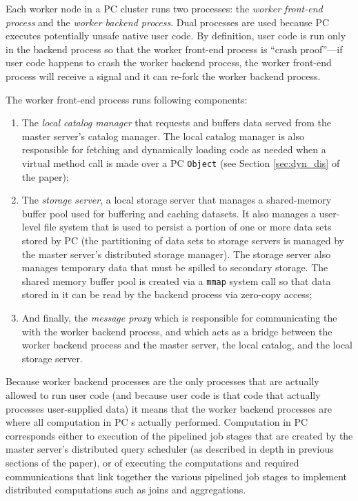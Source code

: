 \noindent 
Each worker node in a PC cluster runs two processes: the \emph{worker front-end process} and the \emph{worker backend process}.
Dual processes are used because PC executes potentially unsafe native user code.  By definition, user code is run only in the backend process so that the
worker front-end process is ``crash proof''---if            
user code happens to crash the worker backend process, the worker front-end process will receive a signal and it can re-fork the worker
backend process.

The worker front-end process runs following components:

\begin{enumerate}
\item The \emph{local catalog manager} that requests and 
buffers data served from the master server's catalog manager.  The local catalog manager is also responsible for fetching and dynamically loading
code as needed when a virtual method call is made over a PC \texttt{Object} (see Section \ref{sec:dyn_dis} of the paper);
\item The \emph{storage server}, a local storage server that manages a shared-memory buffer pool used for buffering and caching datasets.  It also manages
a  user-level file system that is used to persist a portion of one or more data sets stored by PC (the partitioning of data sets to storage servers is managed
by the master server's distributed storage manager).  The storage server also manages temporary data that must be spilled to secondary storage.
The shared memory buffer pool is created via a \texttt{mmap} system call so that
data stored in it can be read by the backend process via zero-copy access;
\item And finally, the \emph{message proxy} which is responsible for communicating the with the worker backend process, and which acts as a bridge between the
worker backend process and the master server, the local catalog, and the local storage server.

\end{enumerate}

Because worker backend processes are the only processes that are actually allowed to run user code (and because user code is that code that actually processes
user-supplied data) it means that the worker backend processes are where all computation in PC s actually performed.  Computation in PC corresponds either
to execution of the 
pipelined job stages that are created by the master server's distributed query scheduler (as described in depth in previous sections of the paper), 
or of executing the computations and required communications
that link together the various pipelined job stages to implement distributed computations such as joins and aggregations.  

